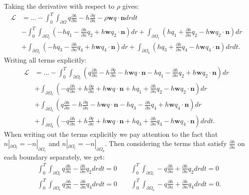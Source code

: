 \documentclass[11pt, a4paper]{article}
\theoremstyle{definition}
\newcommand{\w}{\mathbf{w}}
\newcommand{\n}{\mathbf{n}}
\begin{document}
	Taking the derivative with respect to $\rho$ gives:
	\begin{align*}
		\mathcal{L} &= ... - \int_0^T \int_{\partial \Omega} q \frac{\partial h}{\partial n} - h\frac{\partial q}{\partial n} - \rho \w q  \cdot \n  dr dt\\
		&- \int_0^T \int_{\partial \Omega_l} \left(- h q_1  - \frac{\partial h }{\partial n} q_2 + h \w q_2  \cdot \n \right) dr  + \int_{\partial \Omega_r} \left(h q_1 + \frac{\partial h }{\partial n}q_2 - h \w q_2 \cdot \n  \right) dr  \\
		& + \int_{\partial \Omega_t} \left(- h q_3 - \frac{\partial h }{\partial n} q_4 + h \w q_4 \cdot \n  \right) dr  + \int_{\partial \Omega_b} \left(h q_3 + \frac{\partial h}{\partial n}q_4 - h \w q_4 \cdot \n  \right) drdt.
	\end{align*}
	Writing all terms explicitly:
	\begin{align*}
		\mathcal{L} &= ... - \int_0^T \int_{\partial \Omega_l} \left( q \frac{\partial h}{\partial n} - h\frac{\partial q}{\partial n} - h \w q \cdot \n- h q_1 - \frac{\partial h }{\partial n} q_2 + h \w q_2 \cdot \n \right) dr\\
		&  + \int_{\partial \Omega_r} \left(- q \frac{\partial h}{\partial n} + h\frac{\partial q}{\partial n} + h \w q  \cdot \n + h q_1 + \frac{\partial h }{\partial n}q_2 - h \w q_2 \cdot \n \right) dr  \\
		& + \int_{\partial \Omega_t} \left(q \frac{\partial h}{\partial n} - h\frac{\partial q}{\partial n} - h \w q  \cdot \n- h q_3 - \frac{\partial h }{\partial n} q_4 + h \w q_4 \cdot \n \right) dr\\
		&  + \int_{\partial \Omega_b} \left(-q \frac{\partial h}{\partial n} + h\frac{\partial q}{\partial n} + h \w q  \cdot \n + h q_3 + \frac{\partial h}{\partial n}q_4 - h \w q_4  \cdot \n\right) drdt.
	\end{align*}
	When writing out the terms explicitly we pay attention to the fact that $n|_{\partial \Omega_l} = - n|_{\partial \Omega_r}$ and $n|_{\partial \Omega_t} = - n|_{\partial \Omega_b}$.
	Then considering the terms that satisfy $\frac{\partial h}{\partial n}$ on each boundary separately, we get:
	\begin{align*}
		&\int_0^T \int_{\partial \Omega_l} q \frac{\partial h}{\partial n}- \frac{\partial h }{\partial n} q_2 dr dt= 0 \qquad \int_0^T \int_{\partial \Omega_r} -q \frac{\partial h}{\partial n}+ \frac{\partial h }{\partial n}q_2 dr dt= 0 \\
		&\int_0^T \int_{\partial \Omega_t} q \frac{\partial h}{\partial n}- \frac{\partial h }{\partial n} q_4 dr dt= 0 \qquad \int_0^T \int_{\partial \Omega_b} -q \frac{\partial h}{\partial n}+ \frac{\partial h}{\partial n}q_4 dr dt= 0. \\
	\end{align*}
\end{document}
